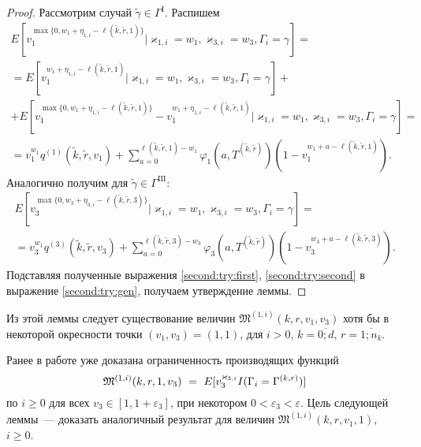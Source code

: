 \begin{proof}
Рассмотрим случай $\tilde{\gamma}\in \Gamma^{\mathrm{I}}$. Распишем 
\begin{multline}
    E[v_1^{\max{\{0,  w_1 + \eta_{1, i} - \ell(\tilde{k}, \tilde{r}, 1)\}}} | \varkappa_{1, i}=w_1, \varkappa_{3, i}=w_3,  \Gamma_i=\gamma] = \\ =
    E[v_1^{ w_1 + \eta_{1, i} - \ell(\tilde{k}, \tilde{r}, 1)} | \varkappa_{1, i}=w_1, \varkappa_{3, i}=w_3,  \Gamma_i=\gamma] + \\ +
     E[v_1^{\max{\{0,  w_1 + \eta_{1, i} - \ell(\tilde{k}, \tilde{r}, 1)\}}} - v_1^{ w_1 + \eta_{1, i} - \ell(\tilde{k}, \tilde{r}, 1)} | \varkappa_{1, i}=w_1, \varkappa_{3, i}=w_3,  \Gamma_i=\gamma] = \\ =
      v_1^{w_1} q^{(1)}(\tilde{k}, \tilde{r}, v_1) +
     \sum_{a=0}^{\ell(\tilde{k}, \tilde{r}, 1) - w_1} \varphi_1(a, T^{(\tilde{k}, \tilde{r})})(1-v_1^{w_1+a-\ell(\tilde{k}, \tilde{r}, 1)}).
\label{second:try:first}
\end{multline}
Аналогично получим для  $\tilde{\gamma}\in \Gamma^{\mathrm{III}}$:
\begin{multline}
    E[v_3^{\max{\{0,  w_3 + \eta_{3, i} - \ell(\tilde{k}, \tilde{r}, 3)\}}} | \varkappa_{1, i}=w_1, \varkappa_{3, i}=w_3,  \Gamma_i=\gamma] = \\ =
     v_3^{w_1} q^{(3)}(\tilde{k}, \tilde{r}, v_3) +
     \sum_{a=0}^{\ell(\tilde{k}, \tilde{r}, 3) - w_3} \varphi_3(a, T^{(\tilde{k}, \tilde{r})})(1-v_3^{w_3+a-\ell(\tilde{k}, \tilde{r}, 3)}).
\label{second:try:second}
\end{multline}
Подставляя полученные выражения \eqref{second:try:first},  \eqref{second:try:second} в выражение  \eqref{second:try:gen},  получаем утверждение леммы.
\end{proof}

Из этой леммы следует существование величин $\mathfrak{M}^{(1, i)}(k,  r, v_1, v_3)$ хотя бы в некоторой окресности точки $(v_1, v_3)=(1, 1)$,  для $i>0$,  $k=\overline{0;d}$,  $r=\overline{1;n_{k}}$.

Ранее в работе уже доказана ограниченность  производящих функций
$$\mathfrak{M}^{(1,i)}(k,r,1,v_3)~\hm= ~E[v_3^{\varkappa_{3,i}}{I(\Gamma_{i}=\Gamma^{(k,r)})}]
$$ по $i\geqslant 0$ для всех $v_3\in [1,1+\varepsilon_3]$, при некотором $0 < \varepsilon_3 < \varepsilon$. Цель следующей леммы~--- доказать аналогичный результат для величин $\mathfrak{M}^{(1,i)}(k,r,v_1,1)$, $i\geqslant 0$.

